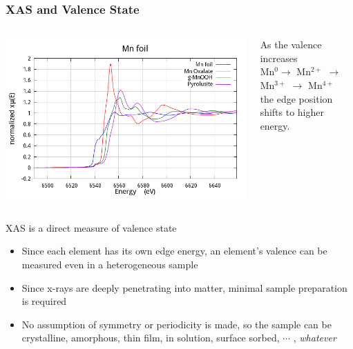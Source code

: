 \documentclass[10pt, xcolor=x11names, compress, handout]{beamer}
\begin{document}
\begin{frame}
  \frametitle{XAS and Valence State}

  \begin{columns}
    \begin{column}{0.5\linewidth}
      \includegraphics[width=\linewidth]{xas/mn_xanes.png}
    \end{column}
    \begin{column}{0.5\linewidth}
      As the valence increases\\[1ex]

      {\color{Blue3}Mn$^0$}$\rightarrow$ 
      \alert{Mn$^{2+}$} $\rightarrow$
      {\color{Green4}Mn$^{3+}$} $\rightarrow$
      {\color{Purple3}Mn$^{4+}$}\\[1ex]

      the edge position shifts to higher energy.
    \end{column}
  \end{columns}    

  \bigskip

  \begin{block}{XAS is a direct measure of valence state}
    \begin{itemize}
    \item Since each element has its own edge energy, an element's
      valence can be measured even in a heterogeneous sample
    \item Since x-rays are deeply penetrating into matter, minimal
      sample preparation is required
    \item No assumption of symmetry or periodicity is made, so the
      sample can be crystalline, amorphous, thin film, in solution,
      surface sorbed, $\cdots$ , \textit{whatever}
    \end{itemize}
  \end{block}

\end{frame}
\end{document}
